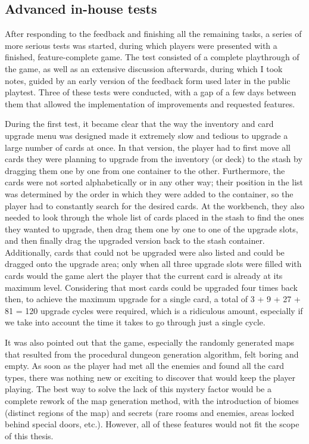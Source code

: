 \subsection{Advanced in-house tests}

After responding to the feedback and finishing all the remaining tasks, a series of more serious tests was started, during which players were presented with a finished, feature-complete game. The test consisted of a complete playthrough of the game, as well as an extensive discussion afterwards, during which I took notes, guided by an early version of the feedback form used later in the public playtest. Three of these tests were conducted, with a gap of a few days between them that allowed the implementation of improvements and requested features.

During the first test, it became clear that the way the inventory and card upgrade menu was designed made it extremely slow and tedious to upgrade a large number of cards at once. In that version, the player had to first move all cards they were planning to upgrade from the inventory (or deck) to the stash by dragging them one by one from one container to the other. Furthermore, the cards were not sorted alphabetically or in any other way; their position in the list was determined by the order in which they were added to the container, so the player had to constantly search for the desired cards. At the workbench, they also needed to look through the whole list of cards placed in the stash to find the ones they wanted to upgrade, then drag them one by one to one of the upgrade slots, and then finally drag the upgraded version back to the stash container. Additionally, cards that could not be upgraded were also listed and could be dragged onto the upgrade area; only when all three upgrade slots were filled with cards would the game alert the player that the current card is already at its maximum level. Considering that most cards could be upgraded four times back then, to achieve the maximum upgrade for a single card, a total of 3 + 9 + 27 + 81 = 120 upgrade cycles were required, which is a ridiculous amount, especially if we take into account the time it takes to go through just a single cycle.

It was also pointed out that the game, especially the randomly generated maps that resulted from the procedural dungeon generation algorithm, felt boring and empty. As soon as the player had met all the enemies and found all the card types, there was nothing new or exciting to discover that would keep the player playing. The best way to solve the lack of this mystery factor would be a complete rework of the map generation method, with the introduction of biomes (distinct regions of the map) and secrets (rare rooms and enemies, areas locked behind special doors, etc.). However, all of these features would not fit the scope of this thesis.

